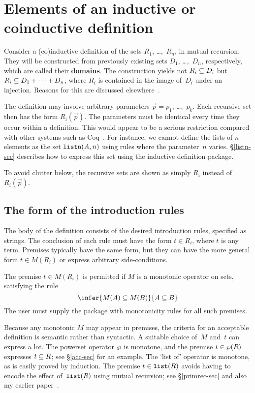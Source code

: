 \section{Elements of an inductive or coinductive definition}\label{basic-sec}
Consider a (co)inductive definition of the sets $R_1$, \ldots,~$R_n$, in
mutual recursion.  They will be constructed from previously existing sets
$D_1$, \ldots,~$D_n$, respectively, which are called their {\bf domains}. 
The construction yields not $R_i\subseteq D_i$ but $R_i\subseteq D_1+\cdots+D_n$, where
$R_i$ is contained in the image of~$D_i$ under an
injection.  Reasons for this are discussed
elsewhere~\cite[\S4.5]{paulson-set-II}.

The definition may involve arbitrary parameters $\vec{p}=p_1$,
\ldots,~$p_k$.  Each recursive set then has the form $R_i(\vec{p})$.  The
parameters must be identical every time they occur within a definition.  This
would appear to be a serious restriction compared with other systems such as
Coq~\cite{paulin92}.  For instance, we cannot define the lists of
$n$ elements as the set ${\tt listn}(A,n)$ using rules where the parameter~$n$
varies.  \S\ref{listn-sec} describes how to express this set using the
inductive definition package.

To avoid clutter below, the recursive sets are shown as simply $R_i$
instead of $R_i(\vec{p})$.

\subsection{The form of the introduction rules}\label{intro-sec}
The body of the definition consists of the desired introduction rules,
specified as strings.  The conclusion of each rule must have the form $t\in
R_i$, where $t$ is any term.  Premises typically have the same form, but
they can have the more general form $t\in M(R_i)$ or express arbitrary
side-conditions.

The premise $t\in M(R_i)$ is permitted if $M$ is a monotonic operator on
sets, satisfying the rule 
\[ \infer{M(A)\sbs M(B)}{A\sbs B} \]
The user must supply the package with monotonicity rules for all such premises.

Because any monotonic $M$ may appear in premises, the criteria for an
acceptable definition is semantic rather than syntactic.  A suitable choice
of~$M$ and~$t$ can express a lot.  The powerset operator $\wp$ is
monotone, and the premise $t\in\wp(R)$ expresses $t\subseteq R$; see
\S\ref{acc-sec} for an example.  The `list of' operator is monotone, as is
easily proved by induction.  The premise $t\in{\tt list}(R)$ avoids having to
encode the effect of~${\tt list}(R)$ using mutual recursion; see \S\ref{primrec-sec}
and also my earlier paper~\cite[\S4.4]{paulson-set-II}.

